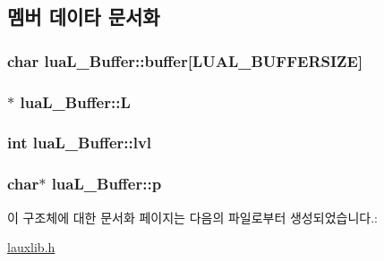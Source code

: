 \subsection{멤버 데이타 문서화}
\hypertarget{structlua_l___buffer_a848307dbf02455a3acfe690a6b3f9a71}{
\subsubsection[{buffer}]{\setlength{\rightskip}{0pt plus 5cm}char {\bf lua\-L\-\_\-\-Buffer\-::buffer}\mbox{[}{\bf \-L\-U\-A\-L\-\_\-\-B\-U\-F\-F\-E\-R\-S\-I\-Z\-E}\mbox{]}}}\label{structlua_l___buffer_a848307dbf02455a3acfe690a6b3f9a71}
\hypertarget{structlua_l___buffer_a66ae63716768952c74910da4351886fb}{
\subsubsection[{\-L}]{$\ast$ {\bf lua\-L\-\_\-\-Buffer\-::\-L}}}\label{structlua_l___buffer_a66ae63716768952c74910da4351886fb}
\hypertarget{structlua_l___buffer_a5edc23a360999279c335bac6f33121db}{
\subsubsection[{lvl}]{\setlength{\rightskip}{0pt plus 5cm}int {\bf lua\-L\-\_\-\-Buffer\-::lvl}}}\label{structlua_l___buffer_a5edc23a360999279c335bac6f33121db}
\hypertarget{structlua_l___buffer_a0af2235170aa873ae30b2dab5a92d78f}{
\subsubsection[{p}]{\setlength{\rightskip}{0pt plus 5cm}char$\ast$ {\bf lua\-L\-\_\-\-Buffer\-::p}}}\label{structlua_l___buffer_a0af2235170aa873ae30b2dab5a92d78f}


이 구조체에 대한 문서화 페이지는 다음의 파일로부터 생성되었습니다.\-:\begin{DoxyCompactItemize}
\item 
\hyperlink{lauxlib_8h}{lauxlib.\-h}\end{DoxyCompactItemize}
